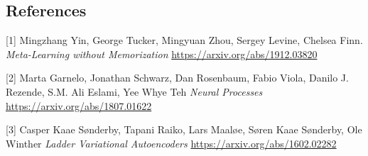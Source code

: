 \documentclass[12pt]{article}
\begin{document}
\newpage
\subsection*{References}

[1] 
Mingzhang Yin, George Tucker, Mingyuan Zhou, Sergey Levine, Chelsea Finn.
\textit{Meta-Learning without Memorization}
\url{https://arxiv.org/abs/1912.03820}

[2] 
Marta Garnelo, Jonathan Schwarz, Dan Rosenbaum, Fabio Viola, Danilo J. Rezende, S.M. Ali Eslami, Yee Whye Teh
\textit{Neural Processes}
\url{https://arxiv.org/abs/1807.01622}

[3]
Casper Kaae Sønderby, Tapani Raiko, Lars Maaløe, Søren Kaae Sønderby, Ole Winther
\textit{Ladder Variational Autoencoders}
\url{https://arxiv.org/abs/1602.02282}
\end{document}
